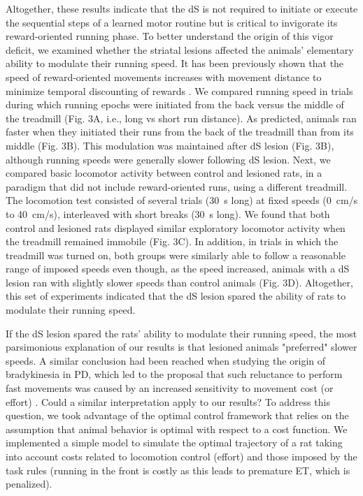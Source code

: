 \par
Altogether, these results indicate that the dS is not required to initiate or execute the sequential steps of a learned motor routine but is critical to invigorate its reward-oriented running phase.
To better understand the origin of this vigor deficit, we examined whether the striatal lesions affected the animals' elementary ability to modulate their running speed.
It has been previously shown that the speed of reward-oriented movements increases with movement distance to minimize temporal discounting of rewards \cite{Shadmehr2010JN, Reppert2018JNPhys}.
We compared running speed in trials during which running epochs were initiated from the back versus the middle of the treadmill (Fig. 3A, i.e., long vs short run distance).
As predicted, animals ran faster when they initiated their runs from the back of the treadmill than from its middle (Fig. 3B). This modulation was maintained after dS lesion (Fig. 3B), although running speeds were generally slower following dS lesion.
Next, we compared basic locomotor activity between control and lesioned rats, in a paradigm that did not include reward-oriented runs, using a different treadmill.
The locomotion test consisted of several trials (30~s long) at fixed speeds (0~cm/s to 40~cm/s), interleaved with short breaks (30~s long).
We found that both control and lesioned rats displayed similar exploratory locomotor activity when the treadmill remained immobile (Fig. 3C).
In addition, in trials in which the treadmill was turned on, both groups were similarly able to follow a reasonable range of imposed speeds even though, as the speed increased, animals with a dS lesion ran with slightly slower speeds than control animals (Fig. 3D).
Altogether, this set of experiments indicated that the dS lesion spared the ability of rats to modulate their running speed.
\par
If the dS lesion spared the rats' ability to modulate their running speed, the most parsimonious explanation of our results is that lesioned animals "preferred" slower speeds.
A similar conclusion had been reached when studying the origin of bradykinesia in PD, which led to the proposal that such reluctance to perform fast movements was caused by an increased sensitivity to movement cost (or effort) \cite{Mazzoni2007JN, Baraduc2013JN}.
Could a similar interpretation apply to our results?
To address this question, we took advantage of the optimal control framework that relies on the assumption that animal behavior is optimal with respect to a cost function.
We implemented a simple model to simulate the optimal trajectory of a rat taking into account costs related to locomotion control (effort) and those imposed by the task rules (running in the front is costly as this leads to premature ET, which is penalized).
